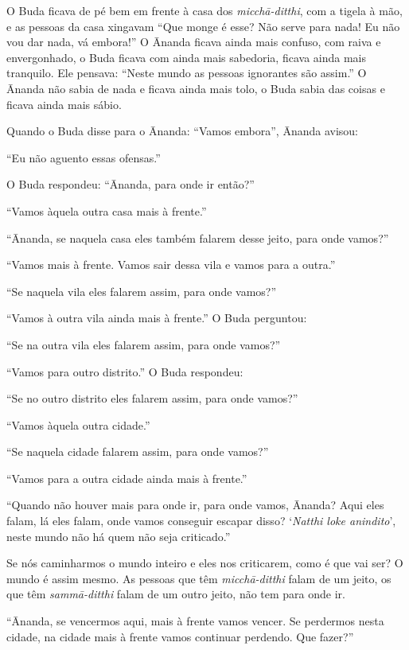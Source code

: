 O Buda ficava de pé bem em frente à casa dos
\textit{micchā-ditthi}, com a tigela à mão, e as pessoas da casa
xingavam “Que monge é esse? Não serve para nada! Eu não vou dar nada,
vá embora!” O Ānanda ficava ainda mais confuso, com raiva e
envergonhado, o Buda ficava com ainda mais sabedoria, ficava ainda mais
tranquilo. Ele pensava: “Neste mundo as pessoas ignorantes são assim.”
O Ānanda não sabia de nada e ficava ainda mais tolo, o Buda sabia das
coisas e ficava ainda mais sábio. 

Quando o Buda disse para o Ānanda: “Vamos embora”, Ānanda
avisou: 

“Eu não aguento essas ofensas.” 

O Buda respondeu: “Ānanda, para onde ir então?”

“Vamos àquela outra casa mais à frente.”

“Ānanda, se naquela casa eles também falarem desse jeito, para
onde vamos?”

“Vamos mais à frente. Vamos sair dessa vila e vamos para a outra.”

“Se naquela vila eles falarem assim, para onde vamos?”

“Vamos à outra vila ainda mais à frente.” O Buda perguntou:

“Se na outra vila eles falarem assim, para onde vamos?”

“Vamos para outro distrito.” O Buda respondeu: 

“Se no outro distrito eles falarem assim, para onde vamos?”

“Vamos àquela outra cidade.”

“Se naquela cidade falarem assim, para onde vamos?”

“Vamos para a outra cidade ainda mais à frente.”

“Quando não houver mais para onde ir, para onde vamos, Ānanda?
Aqui eles falam, lá eles falam, onde vamos conseguir escapar disso?
‘\textit{Natthi loke anindito}’, neste mundo não há quem não
seja criticado.” 

Se nós caminharmos o mundo inteiro e eles nos criticarem, como é que
vai ser? O mundo é assim mesmo. As pessoas que têm
\textit{micchā-ditthi} falam de um jeito, os que têm
\textit{sammā-ditthi} falam de um outro jeito, não tem para onde ir. 

“Ānanda, se vencermos aqui, mais à frente vamos vencer. Se
perdermos nesta cidade, na cidade mais à frente vamos continuar
perdendo. Que fazer?”

